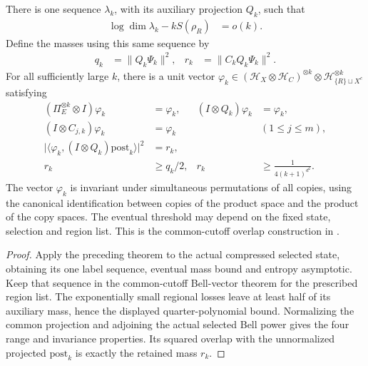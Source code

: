 \begin{theorem}
    There is one sequence $\lambda_k$, with its auxiliary projection
    $Q_k$, such that
    \begin{align*}
        \log\dim\lambda_k-kS(\rho_R)&=o(k).
    \end{align*}
    Define the masses using this same sequence by
    \begin{align*}
        q_k&=\|Q_k\Psi_k\|^2,
        &r_k&=\|C_kQ_k\Psi_k\|^2.
    \end{align*}
    For all sufficiently large $k$, there is a unit vector
    $\varphi_k\in(\mathcal H_X\otimes\mathcal H_C)^{\otimes k}
    \otimes\mathcal H_{\{R\}\sqcup X^c}^{\otimes k}$ satisfying
    \begin{align*}
        (\Pi_E^{\otimes k}\otimes I)\varphi_k&=\varphi_k,
        &(I\otimes Q_k)\varphi_k&=\varphi_k,\\
        (I\otimes C_{j,k})\varphi_k&=\varphi_k
            &&(1\le j\le m),\\
        \bigl|\langle\varphi_k,(I\otimes Q_k)
            \mathrm{post}_k\rangle\bigr|^2&=r_k,\\
        r_k&\ge q_k/2,
        &r_k&\ge\frac{1}{4(k+1)^{d^2}}.
    \end{align*}
    The vector $\varphi_k$ is invariant under simultaneous permutations
    of all copies, using the canonical identification between copies of
    the product space and the product of the copy spaces. The eventual
    threshold may depend on the fixed state, selection and region list.
    This is the common-cutoff overlap construction in
    \cite[Section~7, lines~283--298 and 332--354]{OpenAI2026AreaLaw}.
\end{theorem}
\begin{proof}
    \leanok
    Apply the preceding theorem to the actual compressed selected state,
    obtaining its one label sequence, eventual mass bound and entropy
    asymptotic. Keep that sequence in the common-cutoff Bell-vector theorem
    for the prescribed region list. The exponentially small regional losses
    leave at least half of its auxiliary mass, hence the displayed
    quarter-polynomial bound. Normalizing the common projection and adjoining
    the actual selected Bell power gives the four range and invariance
    properties. Its squared overlap with the unnormalized projected
    $\mathrm{post}_k$ is exactly the retained mass $r_k$.
\end{proof}

